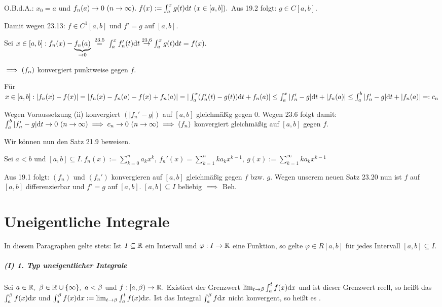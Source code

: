\documentclass[a4paper,twoside,DIV15,BCOR12mm]{scrbook}
\begin{document}
\newcommand{\gehtwegen}[1]{\overset{#1}{\to}}
\newcommand{\gehtnach}[1]{\overset{\text{#1}}{\to}}

\begin{beweis}
O.B.d.A.: $x_0=a$ und $f_n(a) \to 0\ (n \to \infty).\ f(x):=\int_a^x g(t)\dt\ (x \in [a,b]).$ Aus 19.2 folgt: $g \in C[a,b].$

Damit wegen 23.13: $f \in C^1[a,b]$ und $f'=g$ auf $[a,b].$

Sei $x \in [a,b]: f_n(x) - \underbrace{f_n(a)}_{\to 0} \gleichnach{23.5} \int_a^x f_n'(t)\dt \gehtnach{23.6} \int_a^x g(t)\dt = f(x).$

$\implies (f_n)$ konvergiert punktweise gegen $f$.

Für $x \in [a,b]: |f_n(x)-f(x)| = |f_n(x)-f_n(a)-f(x)+f_n(a)| = |\int_a^x (f_n'(t)-g(t))\text{d}t + f_n(a)| \le \int_a^x |f_n'-g|\text{d}t + |f_n(a)| \le \int_a^b |f_n'-g|\text{d}t + |f_n(a)| =: c_n$

Wegen Voraussetzung (ii) konvergiert $(|f_n'-g|)$ auf $[a,b]$ gleichmäßig gegen $0$. Wegen 23.6 folgt damit: $\int_a^b |f_n'-g| \text{d}t \to 0\ (n \to \infty) \implies c_n \to 0\ (n \to \infty) \implies (f_n)$ konvergiert gleichmäßig auf $[a,b]$ gegen $f$.
\end{beweis}

Wir können nun den Satz 21.9 beweisen.

\begin{beweis}
Sei $a<b$ und $[a,b] \subseteq I.\ f_n(x) := \sum_{k=0}^n a_k x^k,\ f_n'(x) = \sum_{k=1}^n ka_kx^{k-1},\ g(x) := \sum_{k=1}^\infty ka_kx^{k-1}$

Aus 19.1 folgt: $(f_n)$ und $(f_n')$ konvergieren auf $[a,b]$ gleichmäßig gegen $f$ bzw. $g$. Wegen unserem neuen Satz 23.20 nun ist $f$ auf $[a,b]$ differenzierbar und $f'=g$ auf $[a,b]$. $[a,b] \subseteq I$ beliebig $\implies$ Beh.
\end{beweis}

\chapter{Uneigentliche Integrale}

In diesem Paragraphen gelte stets: Ist $I \subseteq \mathbb{R}$ ein Intervall und $\varphi: I \to \mathbb{R}$ eine Funktion, so gelte $\varphi \in R[a,b]$ für jedes Intervall $[a,b] \subseteq I$.

\paragraph{(I) 1. Typ uneigentlicher Integrale}
Sei $a \in \mathbb{R},\ \beta \in \mathbb{R} \cup \{\infty\},\ a<\beta$ und $f:[a,\beta) \to \mathbb{R}.$ Existiert der Grenzwert $\lim_{t\to\beta} \int_a^t f(x)\text{d}x$ und ist dieser Grenzwert reell, so heißt das  $\int_a^\beta f(x)\text{d}x$  und $\int_a^\beta f(x)\text{d}x := \lim_{t\to\beta} \int_a^t f(x)\text{d}x.$ Ist das Integral $\int_a^\beta f\text{d}x$ nicht konvergent, so heißt es .
\end{document}
